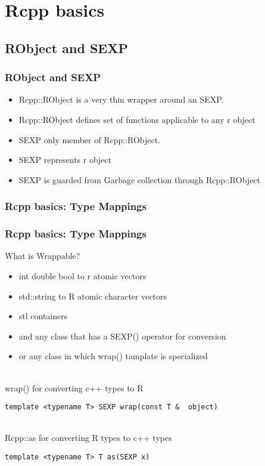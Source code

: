 \documentclass[hyperef={
    colorlinks=true,
    linkcolor=blue,
    filecolor=black,
urlcolor=blue}
]{beamer}
\begin{document}
\section{Rcpp basics}
\subsection{RObject and SEXP}
\begin{frame}
\frametitle{RObject and SEXP}
\begin{itemize}
    \item Rcpp::RObject is a very thin wrapper around an SEXP. 
    \item Rcpp::RObject defines set of functions applicable to any r object
    \item SEXP only member of Rcpp::RObject.
    \item SEXP represents r object
    \item SEXP is guarded from Garbage collection through Rcpp::RObject
\end{itemize}
\end{frame}        

\subsubsection{Rcpp basics: Type Mappings}
\begin{frame}[fragile]
\frametitle{Rcpp basics: Type Mappings}
    What is Wrappable?
\begin{itemize}
    \item int double bool to r atomic vectors
    \item std::string to R atomic character vectors
    \item stl containers
    \item and any class that has a SEXP() operator for conversion
    \item or any class in which wrap() tamplate is specialized
\end{itemize}
\hspace{4 mm} \\
wrap() for converting c++ types to R
\begin{verbatim}
template <typename T> SEXP wrap(const T &  object)
\end{verbatim}
\hspace{4 mm} \\
Rcpp::as for converting R types to c++ types
\begin{verbatim}
template <typename T> T as(SEXP x)
\end{verbatim} 
\end{frame}
\end{document}
